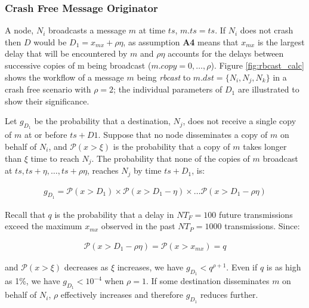         \subsubsection*{Crash Free Message Originator}
        A node, $N_i$ broadcasts a message $m$ at time $ts$, $m.ts = ts$.  If $N_i$ does not crash then $D$ would be $D_1 = x_{mx} + \rho\eta$, as assumption \textbf{A4} means that $x_{mx}$ is the largest delay that will be encountered by $m$ and $\rho\eta$ accounts for the delays between successive copies of m being broadcast ($m.copy = 0,\ldots,\rho$).  Figure \ref{fig:rbcast_calc} shows the workflow of a message $m$ being \emph{rbcast} to $m.dst = \{N_i, N_j, N_k\}$ in a crash free scenario with $\rho = 2$; the individual parameters of $D_1$ are illustrated to show their significance.  
        
        Let $g_{D_1}$ be the probability that a destination, $N_j$, does not receive a single copy of $m$ at or before $ts + D1$.  Suppose that no node disseminates a copy of $m$ on behalf of $N_i$, and $\mathcal{P}(x > \xi)$ is the probability that a copy of $m$ takes longer than $\xi$ time to reach $N_{j}$.  The probability that none of the copies of $m$ broadcast at $ts, ts+\eta, \ldots,  ts+\rho \eta$, reaches $N_{j}$ by time $ts+D_1$, is:
        
        \begin{equation*}
		    \begin{aligned}
		        g_{D_1}= \mathcal{P}(x > D_1) \times \mathcal{P}(x > D_1 - \eta) \times \ldots \mathcal{P}(x > D_1 - \rho \eta)
		    \end{aligned}
		\end{equation*}

		
		Recall that $q$ is the probability that a delay in $NT_F=100$ future transmissions exceed the maximum $x_{mx}$ observed in the past $NT_P=1000$ transmissions. Since:
        
        \begin{equation*}
		    \begin{aligned}
		        \mathcal{P}(x > D_1 - \rho \eta) = \mathcal{P}(x > x_{mx}) = q
		    \end{aligned}
		\end{equation*}
		
and $\mathcal{P}(x > \xi)$ decreases as $\xi$ increases, we have $g_{D_1} < q^{\rho+1}$.  Even if $q$ is as high as 1\%, we have $g_{D_1} < 10^{-4}$ when $\rho=1$. If some destination disseminates $m$ on behalf of $N_i$, $\rho$ effectively increases and therefore $g_{D_1}$ reduces further.

